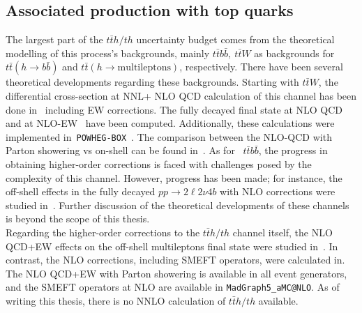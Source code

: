 \subsection{Associated production with top quarks}
The largest part of the $t\bar t h/th$ uncertainty budget comes from the theoretical modelling of this process's backgrounds, mainly $t \bar t b\bar b,\ t\bar t W$ as backgrounds for $ t\bar t (h \to b\bar b)$ and $ t \bar t ( h \to \mathrm{multileptons})$, respectively. There have been several theoretical developments regarding these backgrounds. Starting with $t\bar t W$, the differential cross-section at NNL+ NLO QCD calculation of this channel has been done in~\cite{Broggio:2019ewu,Kulesza:2020nfh} including EW corrections. The fully decayed final state at NLO QCD~\cite{Bevilacqua:2020pzy,Denner:2020hgg,Bevilacqua:2020srb} and at NLO-EW~\cite{Denner:2021hqi} have been computed. Additionally, these calculations were implemented in~\texttt{POWHEG-BOX}~\cite{Cordero:2021iau}. The comparison between the NLO-QCD with Parton showering vs on-shell can be found in~\cite{Bevilacqua:2021tzp}. As for ~$t \bar t b\bar b$, the progress in obtaining higher-order corrections is faced with challenges posed by the complexity of this channel. However, progress has been made; for instance, the off-shell effects in the fully decayed $ pp \to 2 \ell 2 \nu  4 b$ with NLO corrections were studied in~\cite{Denner:2020orv, Bevilacqua:2021cit}. Further discussion of the theoretical developments of these channels is beyond the scope of this thesis. \\
Regarding the higher-order corrections to the $t\bar t h /t h$ channel itself, the NLO QCD+EW effects on the off-shell multileptons final state were studied in~\cite{Denner:2019zdz}. In contrast, the NLO corrections, including SMEFT operators, were calculated in\cite{Maltoni:2016yxb}. The NLO QCD+EW with Parton showering is available in all event generators, and the SMEFT operators at NLO are available in \texttt{MadGraph5\_aMC@NLO}.  As of writing this thesis, there is no NNLO calculation of $t\bar t h /t h$ available. 

